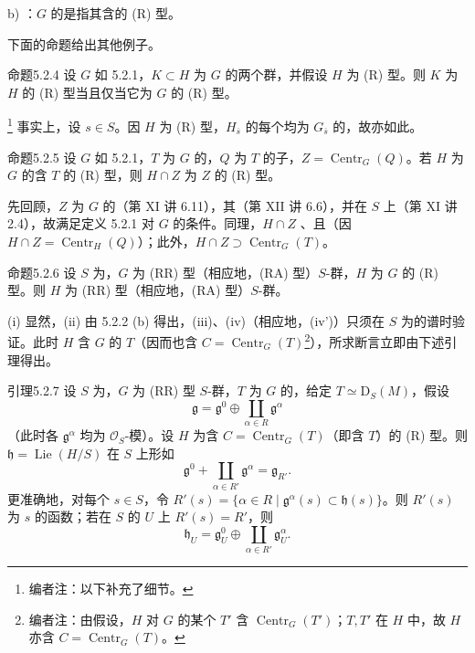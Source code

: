 b) ：$G$ 的是指其含的 (R) 型。

下面的命题给出其他例子。
\begin{SGAresult}{命题}{5.2.4} 设 $G$ 如 5.2.1，$K\subset H$ 为 $G$ 的两个群，并假设 $H$ 为 (R) 型。则 $K$ 为 $H$ 的 (R) 型当且仅当它为 $G$ 的 (R) 型。\end{SGAresult}
\footnote{编者注：以下补充了细节。} 事实上，设 $s\in S$。因 $H$ 为 (R) 型，$H_{\overline s}$ 的每个均为 $G_{\overline s}$ 的，故亦如此。
\begin{SGAresult}{命题}{5.2.5} 设 $G$ 如 5.2.1，$T$ 为 $G$ 的，$Q$ 为 $T$ 的子，$Z=\operatorname{Centr}_G(Q)$。若 $H$ 为 $G$ 的含 $T$ 的 (R) 型，则 $H\cap Z$ 为 $Z$ 的 (R) 型。\end{SGAresult}
先回顾，$Z$ 为 $G$ 的（第 XI 讲 6.11），其（第 XII 讲 6.6），并在 $S$ 上（第 XI 讲 2.4），故满足定义 5.2.1 对 $G$ 的条件。同理，$H\cap Z$
、且（因 $H\cap Z=\operatorname{Centr}_H(Q)$）；此外，$H\cap Z\supset\operatorname{Centr}_G(T)$。
\begin{SGAresult}{命题}{5.2.6} 设 $S$ 为，$G$ 为 (RR) 型（相应地，(RA) 型）$S$-群，$H$ 为 $G$ 的 (R) 型。则 $H$ 为 (RR) 型（相应地，(RA) 型）$S$-群。\end{SGAresult}
(i) 显然，(ii) 由 5.2.2 (b) 得出，(iii)、(iv)（相应地，(iv')）只须在 $S$ 为的谱时验证。此时 $H$ 含 $G$ 的 $T$（因而也含 $C=\operatorname{Centr}_G(T)$\footnote{编者注：由假设，$H$ 对 $G$ 的某个 $T'$ 含 $\operatorname{Centr}_G(T')$；$T,T'$ 在 $H$ 中，故 $H$ 亦含 $C=\operatorname{Centr}_G(T)$。}），所求断言立即由下述引理得出。
\begin{SGAresult}{引理}{5.2.7} 设 $S$ 为，$G$ 为 (RR) 型 $S$-群，$T$ 为 $G$ 的，给定 $T\simeq\mathrm D_S(M)$，假设
\[\mathfrak g=\mathfrak g^0\oplus\coprod_{\alpha\in R}\mathfrak g^\alpha\]
（此时各 $\mathfrak g^\alpha$ 均为 $\mathcal O_S$-模）。设 $H$ 为含 $C=\operatorname{Centr}_G(T)$（即含 $T$）的 (R) 型。则 $\mathfrak h=\operatorname{Lie}(H/S)$ 在 $S$ 上形如
\[\mathfrak g^0+\coprod_{\alpha\in R'}\mathfrak g^\alpha=\mathfrak g_{R'}.\]
更准确地，对每个 $s\in S$，令 $R'(s)=\{\alpha\in R\mid\mathfrak g^\alpha(s)\subset\mathfrak h(s)\}$。则 $R'(s)$ 为 $s$ 的函数；若在 $S$ 的 $U$ 上 $R'(s)=R'$，则
\[\mathfrak h_U=\mathfrak g_U^0\oplus\coprod_{\alpha\in R'}\mathfrak g_U^\alpha.\]
\end{SGAresult}
